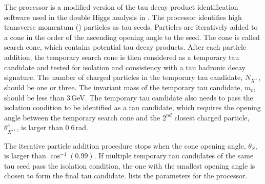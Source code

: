 The \BonoTauFinder processor is a modified version of the tau decay product identification software used in the double Higgs analysis in . The processor identifies high transverse momentum (\pT) particles as tau seeds. Particles are iteratively added to a cone in the order of the ascending opening angle to the seed. The cone is called search cone, which contains potential tau decay products. After each particle addition, the temporary search cone is then considered as a temporary  tau candidate and tested for isolation and consistency  with a tau hadronic decay signature. The number of charged particles in the temporary tau candidate, $N_{X^+}$, should be one or three. The invariant mass of the temporary tau candidate, $m_{c}$, should be less than 3\,GeV. The temporary tau candidate also needs to pass the isolation condition to be identified as a tau candidate, which requires the opening angle between the temporary search cone  and the $2^{nd}$ closest charged particle, $\theta^{c}_{X'^+}$, is larger than 0.6\,rad.

The iterative particle addition procedure stops when the cone opening angle, $\theta_S$, is larger than $\cos^{-1}(0.99)$. If multiple temporary tau candidates of the same tau seed pass the isolation condition, the one with the smallest opening angle is chosen to form the final tau candidate.  lists the parameters  for the  \BonoTauFinder processor.








